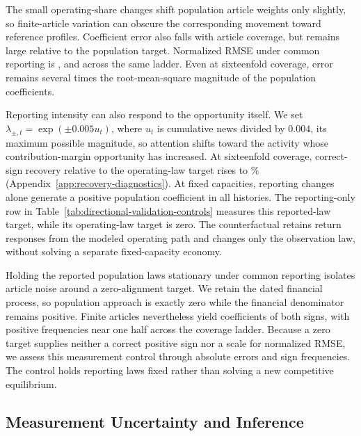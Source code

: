 The small operating-share changes shift population article weights only
slightly, so finite-article variation can obscure the corresponding movement
toward reference profiles.
Coefficient error also falls with article coverage, but remains large
relative to the population target.
Normalized RMSE under common reporting is
,
 and
 across the same ladder.
Even at sixteenfold coverage, error remains several times the root-mean-square
magnitude of the population coefficients.

Reporting intensity can also respond to the opportunity itself.
We set $\lambda_{\pm,t}=\exp(\pm0.005u_t)$, where $u_t$ is cumulative
news divided by $0.004$, its maximum possible magnitude, so attention shifts
toward the activity whose contribution-margin opportunity has increased.
At sixteenfold coverage, correct-sign recovery relative to the operating-law
target rises to
\%
(Appendix~\ref{app:recovery-diagnostics}).
At fixed capacities, reporting changes alone generate a positive population
coefficient in all
 histories.
The reporting-only row in Table~\ref{tab:directional-validation-controls}
measures this reported-law target, while its operating-law target is zero.
The counterfactual retains return responses from the modeled operating
path and changes only the observation law, without solving a separate
fixed-capacity economy.

Holding the reported population laws stationary under common reporting
isolates article noise around a zero-alignment target.
We retain the dated financial process, so population approach is exactly zero
while the financial denominator remains positive.
Finite articles nevertheless yield coefficients of both signs, with positive
frequencies near one half across the coverage ladder.
Because a zero target supplies neither a correct positive sign nor a scale
for normalized RMSE, we assess this measurement control through absolute
errors and sign frequencies.
The control holds reporting laws fixed rather than solving a new competitive
equilibrium.

\subsection{Measurement Uncertainty and Inference}\label{sec:simulation-uncertainty}

